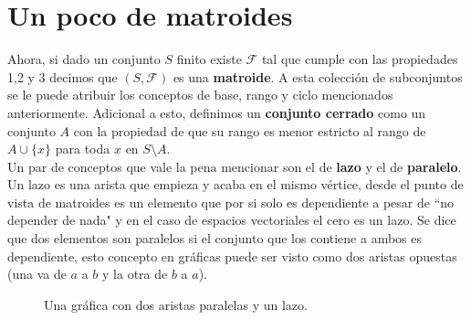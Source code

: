 \section*{Un poco de matroides}

Ahora, si dado un conjunto $S$ finito existe $\mathcal{F}$ tal que cumple con las propiedades 1,2 y 3 %
decimos que $(S,\mathcal{F})$ es una \textbf{matroide}. A esta colección de subconjuntos se le puede atribuir los conceptos de base, rango y ciclo mencionados anteriormente. Adicional a esto, definimos un \textbf{conjunto cerrado} como un conjunto $A$ con la propiedad de que su rango es menor estricto al rango de $A \cup \{ x \}$ para toda $x$ en $S \setminus A$. \\

Un par de conceptos que vale la pena mencionar son el de \textbf{lazo} y el de \textbf{paralelo}. Un lazo es una arista que empieza y acaba en el mismo vértice, desde el punto de vista de matroides es un elemento que por si solo es dependiente a pesar de ``no depender de nada" y en el caso de espacios vectoriales el cero es un lazo.  Se dice que dos elementos son paralelos si el conjunto que los contiene a ambos es dependiente, esto concepto en gráficas puede ser visto como dos aristas opuestas (una va de $a$ a $b$ y la otra de $b$ a $a$). 

\begin{figure}[h]\centering


\caption{Una gráfica con dos aristas paralelas y un lazo.}
\end{figure}